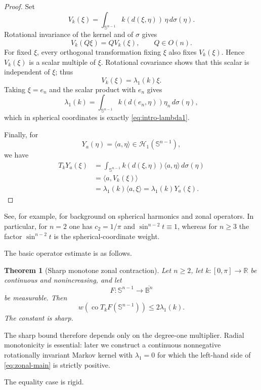 \documentclass[11pt,reqno]{amsart}
\newtheorem{theorem}{Theorem}[section]
\theoremstyle{remark}
\begin{document}
\begin{proof}
Set
\[
 V_k(\xi)
 =
 \int_{\mathbb S^{n-1}}
 k(d(\xi,\eta))\,\eta\,d\sigma(\eta).
\]
Rotational invariance of the kernel and of $\sigma$ gives
\[
 V_k(Q\xi)=QV_k(\xi),
 \qquad Q\in O(n).
\]
For fixed $\xi$, every orthogonal transformation fixing $\xi$ also fixes
$V_k(\xi)$.  Hence $V_k(\xi)$ is a scalar multiple of $\xi$.
Rotational covariance shows that this scalar is independent of $\xi$;
thus
\[
 V_k(\xi)=\lambda_1(k)\xi.
\]
Taking $\xi=e_n$ and the scalar product with $e_n$ gives
\[
 \lambda_1(k)
 =
 \int_{\mathbb S^{n-1}}
 k(d(e_n,\eta))\eta_n\,d\sigma(\eta),
\]
which in spherical coordinates is exactly
\eqref{eq:intro-lambda1}.

Finally, for
\[
 Y_a(\eta)=\langle a,\eta\rangle\in\mathcal H_1(\mathbb S^{n-1}),
\]
we have
\[
 \begin{aligned}
 T_kY_a(\xi)
 &=
 \int_{\mathbb S^{n-1}}
 k(d(\xi,\eta))\langle a,\eta\rangle\,d\sigma(\eta)\\
 &=
 \langle a,V_k(\xi)\rangle\\
 &=
 \lambda_1(k)\langle a,\xi\rangle
 =
 \lambda_1(k)Y_a(\xi).
 \end{aligned}
\]
\end{proof}

See, for example, \cite{DaiXu} for background on spherical harmonics
and zonal operators.  In particular, for $n=2$ one has $c_2=1/\pi$ and
$\sin^{n-2}t\equiv1$, whereas for $n\ge3$ the factor
$\sin^{n-2}t$ is the spherical-coordinate weight.

The basic operator estimate is as follows.

\begin{theorem}[Sharp monotone zonal contraction]\label{thm:zonal-main}
Let $n\ge2$, let $k:[0,\pi]\to\mathbb R$ be continuous and nonincreasing,
and let
\[
 F:\mathbb S^{n-1}\to\overline{\mathbb B^n}
\]
be measurable.  Then
\begin{equation}\label{eq:zonal-main}
 w\!\left(
 \operatorname{co}T_kF(\mathbb S^{n-1})
 \right)
 \le2\lambda_1(k).
\end{equation}
The constant is sharp.
\end{theorem}

The sharp bound therefore depends only on the degree-one multiplier.  Radial monotonicity is
essential: later we construct a continuous nonnegative rotationally
invariant Markov kernel with $\lambda_1=0$ for which the left-hand side of
\eqref{eq:zonal-main} is strictly positive.

The equality case is rigid.
\end{document}
